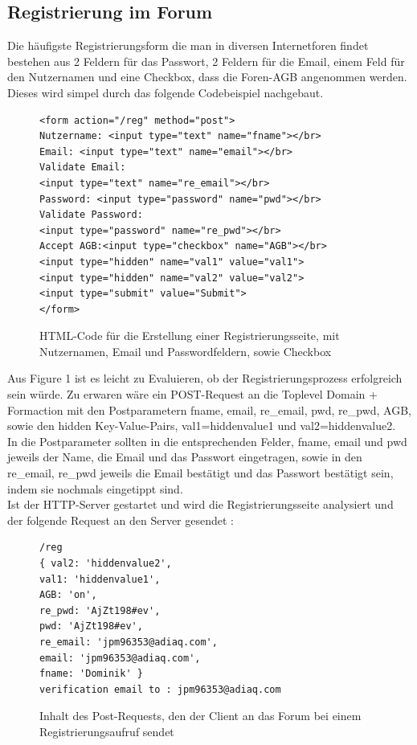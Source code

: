 \subsection{Registrierung im Forum}
Die häufigste Registrierungsform die man in diversen Internetforen findet bestehen aus 2 Feldern für das Passwort, 2 Feldern für die Email, einem Feld für den Nutzernamen und eine Checkbox, dass die Foren-AGB angenommen werden. Dieses wird simpel durch das folgende Codebeispiel nachgebaut.

\begin{figure}[h!]
\begin{lstlisting}[language=HTML5]
<form action="/reg" method="post">
Nutzername: <input type="text" name="fname"></br>
Email: <input type="text" name="email"></br>
Validate Email: 
<input type="text" name="re_email"></br>
Password: <input type="password" name="pwd"></br>
Validate Password: 
<input type="password" name="re_pwd"></br>
Accept AGB:<input type="checkbox" name="AGB"></br>
<input type="hidden" name="val1" value="val1">
<input type="hidden" name="val2" value="val2">
<input type="submit" value="Submit">
</form>
\end{lstlisting}
\caption{HTML-Code für die Erstellung einer Registrierungsseite, mit Nutzernamen, Email und Passwordfeldern, sowie Checkbox}
\end{figure}
\newpage

Aus Figure 1 ist es leicht zu Evaluieren, ob der Registrierungsprozess erfolgreich sein würde. Zu erwaren wäre ein POST-Request an die Toplevel Domain + Formaction mit den Postparametern fname, email, re\_email, pwd, re\_pwd, AGB, sowie den hidden Key-Value-Pairs, val1=hiddenvalue1 und val2=hiddenvalue2.\\
In die Postparameter sollten in die entsprechenden Felder, fname, email und pwd jeweils der Name, die Email und das Passwort eingetragen, sowie in den re\_email, re\_pwd jeweils die Email bestätigt und das Passwort bestätigt sein, indem sie nochmals eingetippt sind.\\
Ist der HTTP-Server gestartet und wird die Registrierungsseite analysiert und der folgende Request an den Server gesendet :

\begin{figure}[ht]
\begin{lstlisting}[language=HTML5]
/reg
{ val2: 'hiddenvalue2',
val1: 'hiddenvalue1',
AGB: 'on',
re_pwd: 'AjZt198#ev',
pwd: 'AjZt198#ev',
re_email: 'jpm96353@adiaq.com',
email: 'jpm96353@adiaq.com',
fname: 'Dominik' }
verification email to : jpm96353@adiaq.com
\end{lstlisting}
\caption{Inhalt des Post-Requests, den der Client an das Forum bei einem Registrierungsaufruf sendet}
\end{figure}

